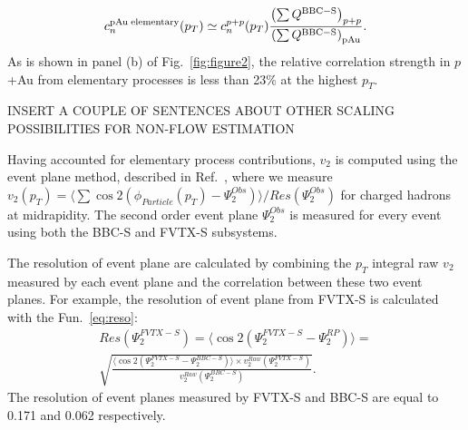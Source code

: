 \documentclass[%
reprint,
showpacs,preprintnumbers,
 amsmath,amssymb,
 aps,
]{revtex4-1}
\newcommand{\pt}{\mbox{$p_T$}\xspace}
\newcommand{\dau}{\mbox{$d$+Au}\xspace}
\newcommand{\pau}{\mbox{$p$+Au}\xspace}
\newcommand{\hau}{\mbox{$^3\text{He}$+Au}\xspace}
\begin{document}
\begin{equation}
c_{n}^{{\rm pAu \; elementary}}(p_{T}) \simeq c_{n}^{p+p}(p_{T})
\frac{\left( \sum Q^{{\rm BBC-S}} \right)_{p+p}}
{\left( \sum Q^{{\rm BBC-S}} \right)_{{\rm pAu}}
}.
\label{eq:dilute}
\end{equation}
As is shown in panel (b) of Fig.~\ref{fig:figure2}, the relative
correlation strength in \pau from elementary processes is less than 23\%
at the highest \pt. 

\color{red}
INSERT A COUPLE OF SENTENCES ABOUT OTHER SCALING POSSIBILITIES FOR NON-FLOW ESTIMATION
\color{black}

Having accounted for elementary process contributions, $v_2$ is computed using the event plane method, described in Ref.~\cite{Adare:2015ctn}, where we measure $v_{2}(p_{T}) = \langle\sum \cos 2(\phi_{Particle}(p_{T})-\Psi^{Obs}_{2})\rangle/Res(\Psi^{Obs}_{2})$ for charged hadrons at midrapidity. The second order event plane $\Psi^{Obs}_{2}$ is measured for every event using both the BBC-S and FVTX-S subsystems. 

The resolution of event plane are calculated by combining the $p_T$ integral raw $v_{2}$ measured by each event plane and the correlation between these two event planes. For example, the resolution of event plane from FVTX-S is calculated with the Fun.~\ref{eq:reso}:
\begin{eqnarray}
Res(\Psi_{2}^{FVTX-S}) = \langle\cos 2(\Psi_{2}^{FVTX-S}-\Psi_{2}^{RP})\rangle = \nonumber \\
\sqrt{\frac{\langle\cos 2(\Psi_{2}^{FVTX-S}-\Psi_{2}^{BBC-S})\rangle\times{v_{2}^{Raw}(\Psi^{FVTX-S}_{2})}}{v_{2}^{Raw}(\Psi^{BBC-S}_{2})}}.
\label{eq:reso}
\end{eqnarray}
The resolution of event planes measured by FVTX-S and BBC-S are equal to 0.171 and 0.062 respectively.


\end{document}
